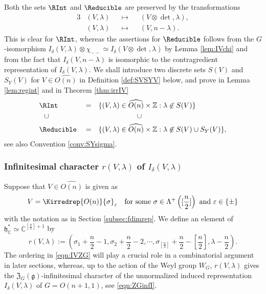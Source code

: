 Both the  sets $\RInt$ and $\Reducible$ are preserved by the transformations
\begin{alignat*}{3}
&(V, \lambda) 
&&\mapsto 
&&(V \otimes \det, \lambda), 
\\
&(V, \lambda) 
&&\mapsto 
&&(V, n-\lambda).  
\end{alignat*}
This is clear for $\RInt$, 
 whereas the assertions for $\Reducible$ follows from
 the $G$-isomorphism $I_{\delta}(V,\lambda) \otimes \chi_{--} \simeq I_{\delta}(V\otimes \det,\lambda)$
 by Lemma \ref{lem:IVchi}
 and from the fact that $I_{\delta}(V,n-\lambda)$
 is isomorphic to the contragredient representation
 of $I_{\delta}(V,\lambda)$.  
We shall introduce two discrete sets 
 $S(V)$ and $S_Y(V)$ for $V \in \widehat {O(n)}$
 in Definition \ref{def:SVSYV} below, 
 and prove in Lemma \ref{lem:regint} and in Theorem \ref{thm:irrIV}
\begin{alignat*}{3}
  &\RInt
  &&=
  &&\{(V,\lambda) \in \widehat {O(n)} \times {\mathbb{Z}}
    :
    \lambda \not \in S(V) \}
\\
  &\hphantom{ii} \cup
  &&
  &&\hphantom{MMMMM}\cup
\\
  &\Reducible
  &&=
  &&\{(V,\lambda) \in \widehat {O(n)} \times {\mathbb{Z}}
    :
    \lambda \not \in S(V) \cup S_Y(V)\},  
\end{alignat*}
 see also Convention \ref{conv:SYsigma}.  


\subsubsection{Infinitesimal character $r(V,\lambda)$ of $I_{\delta}(V,\lambda)$}
\label{subsec:muV}
Suppose that $V \in \widehat {O(n)}$ is given as 
\[
   V=\Kirredrep{O(n)}{\sigma}_{\varepsilon}
  \quad
  \text{for some }
  \sigma \in \Lambda^+\left([\dfrac n 2]\right)
  \text{ and }
  \varepsilon \in \{\pm\}
\]
with the notation
 as in Section \ref{subsec:fdimrep}.  
We define an element of ${\mathfrak {h}}_{\mathbb{C}}^{\ast}
\simeq {\mathbb{C}}^{[\frac n2]+1}$
by 
\begin{equation}
\label{eqn:IVZG}
r(V,\lambda)
:=
(\sigma_{1}+\frac n 2-1,\sigma_{2}+\frac n 2-2, \cdots,\sigma_{[\frac n 2]}+
\frac n 2 - [\frac n 2],\lambda-\frac n 2).  
\end{equation}
The ordering in \eqref{eqn:IVZG} will play a crucial role
 in a combinatorial argument
 in later sections,
 whereas,
 up to the action of the Weyl group $W_G$, 
 $r(V,\lambda)$ gives the 
 ${\mathfrak{Z}}_G({\mathfrak{g}})$-infinitesimal character
 of the unnormalized induced representation
 $I_{\delta}(V, \lambda)$ of $G=O(n+1,1)$, 
 see \eqref{eqn:ZGinfI}.  



